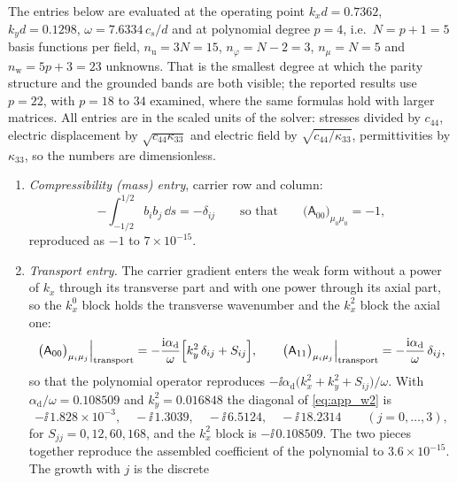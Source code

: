 The entries below are evaluated at the operating point $k_xd=0.7362$,
$k_yd=0.1298$, $\omega=7.6334\,c_s/d$ and at polynomial degree $p=4$, i.e.\
$N=p+1=5$ basis functions per field, $n_{\mathrm{u}}=3N=15$, $n_\varphi=N-2=3$,
$n_\mu=N=5$ and $n_{\mathrm{w}}=5p+3=23$ unknowns.  That is the smallest degree at
which the parity structure and the grounded bands are both visible; the reported
results use $p=22$, with $p=18$ to $34$ examined, where the same formulas hold with larger matrices.
All entries are in the scaled units of the solver: stresses divided by
$c_{44}$, electric displacement by $\sqrt{c_{44}\kappa_{33}}$ and electric field by $\sqrt{c_{44}/\kappa_{33}}$, permittivities by
$\kappa_{33}$, so the numbers are dimensionless.

\begin{enumerate}
\item \emph{Compressibility (mass) entry}, carrier row and column:
\begin{equation}
\label{eq:app_w1}
-\int_{-1/2}^{1/2}b_ib_j\,\dd s=-\delta_{ij}
\qquad\text{so that}\qquad
\bigl(\mathsf A_{00}\bigr)_{\mu_0\mu_0}=-1 ,
\end{equation}
reproduced as $-1$ to $7\times10^{-15}$.
\item \emph{Transport entry.}  The carrier gradient enters the weak form without a
power of $k_x$ through its transverse part and with one power through its axial
part, so the $k_x^{0}$ block holds the transverse wavenumber and the $k_x^{2}$
block the axial one:
\begin{equation}
\label{eq:app_w2}
\bigl(\mathsf A_{00}\bigr)_{\mu_i\mu_j}\Big|_{\text{transport}}
=-\frac{\mathrm{i}\alpha_{\mathrm d}}{\omega}\Bigl[k_y^{2}\,\delta_{ij}+S_{ij}\Bigr],
\qquad
\bigl(\mathsf A_{11}\bigr)_{\mu_i\mu_j}\Big|_{\text{transport}}
=-\frac{\mathrm{i}\alpha_{\mathrm d}}{\omega}\,\delta_{ij} ,
\end{equation}
so that the polynomial operator reproduces
$-\ii\alpha_{\mathrm d}\bigl(k_x^{2}+k_y^{2}+S_{ij}\bigr)/\omega$.  With
$\alpha_{\mathrm d}/\omega=0.108509$ and $k_y^{2}=0.016848$ the
diagonal of \eqref{eq:app_w2} is
\begin{equation}
\label{eq:app_w2_values}
-\ii\,1.828\times10^{-3},\quad -\ii\,1.3039,\quad -\ii\,6.5124,\quad
-\ii\,18.2314 \qquad (j=0,\dots,3),
\end{equation}
for $S_{jj}=0,12,60,168$, and the $k_x^{2}$ block is
$-\ii\,0.108509$.  The two pieces together reproduce the assembled coefficient of
the polynomial to $3.6\times10^{-15}$.  The growth with $j$ is the discrete

\end{enumerate}
